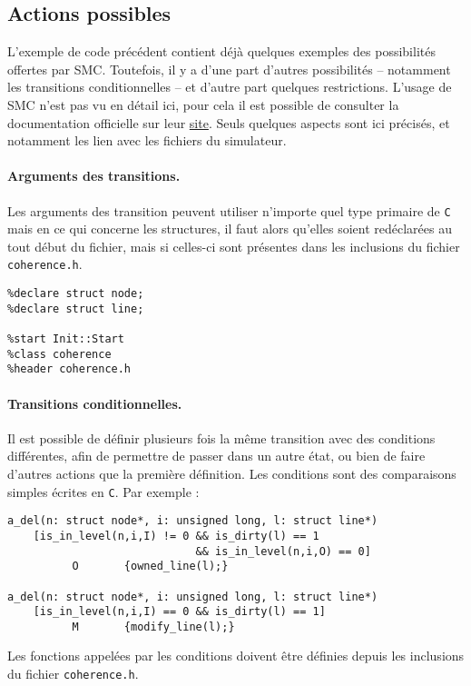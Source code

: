 \subsection{Actions possibles}

L'exemple de code précédent contient déjà quelques exemples des possibilités offertes par \textsf{SMC}. Toutefois, il y a d'une part d'autres possibilités -- notamment les transitions conditionnelles -- et d'autre part quelques restrictions. L'usage de \textsf{SMC} n'est pas vu en détail ici, pour cela il est possible de consulter la documentation officielle sur leur \href{http://smc.sourceforge.net/SmcManual.htm}{site}. Seuls quelques aspects sont ici précisés, et notamment les lien avec les fichiers du simulateur.

\paragraph{Arguments des transitions.}
Les arguments des transition peuvent utiliser n'importe quel type primaire de \texttt{C} mais en ce qui concerne les structures, il faut alors qu'elles soient redéclarées au tout début du fichier, mais si celles-ci sont présentes dans les inclusions du fichier \texttt{coherence.h}.
\begin{framed}
\begin{verbatim}
%declare struct node;
%declare struct line;

%start Init::Start
%class coherence
%header coherence.h
\end{verbatim}
\end{framed}

\paragraph{Transitions conditionnelles.}
Il est possible de définir plusieurs fois la même transition avec des conditions différentes, afin de permettre de passer dans un autre état, ou bien de faire d'autres actions que la première définition. Les conditions sont des comparaisons simples écrites en \texttt{C}. Par exemple :
\begin{framed}
\begin{verbatim}
a_del(n: struct node*, i: unsigned long, l: struct line*)  
    [is_in_level(n,i,I) != 0 && is_dirty(l) == 1 
                             && is_in_level(n,i,O) == 0] 
          O       {owned_line(l);}

a_del(n: struct node*, i: unsigned long, l: struct line*)    
    [is_in_level(n,i,I) == 0 && is_dirty(l) == 1]   
          M       {modify_line(l);}
\end{verbatim}
\end{framed}
Les fonctions appelées par les conditions doivent être définies depuis les inclusions du fichier \texttt{coherence.h}.

